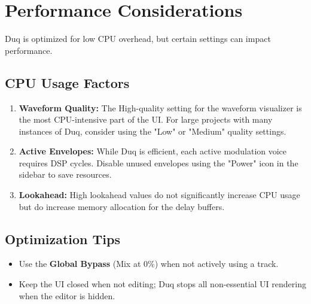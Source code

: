 \chapter{Performance Considerations}
\label{ch:performance_considerations}

Duq is optimized for low CPU overhead, but certain settings can impact performance.

\section{CPU Usage Factors}
\begin{enumerate}
    \item \textbf{Waveform Quality:} The High-quality setting for the waveform visualizer is the most CPU-intensive part of the UI. For large projects with many instances of Duq, consider using the "Low" or "Medium" quality settings.
    \item \textbf{Active Envelopes:} While Duq is efficient, each active modulation voice requires DSP cycles. Disable unused envelopes using the "Power" icon in the sidebar to save resources.
    \item \textbf{Lookahead:} High lookahead values do not significantly increase CPU usage but do increase memory allocation for the delay buffers.
\end{enumerate}

\section{Optimization Tips}
\begin{itemize}
    \item Use the \textbf{Global Bypass} (Mix at 0\%) when not actively using a track.
    \item Keep the UI closed when not editing; Duq stops all non-essential UI rendering when the editor is hidden.
\end{itemize}
